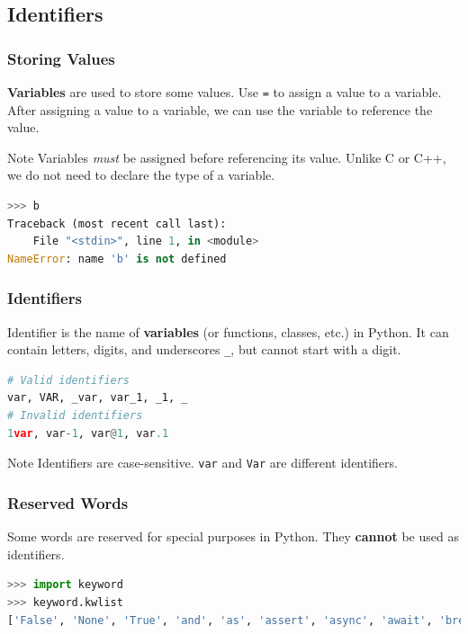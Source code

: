\documentclass[beamer, en, version=2.0]{huangfusl-template}
\begin{document}
    \subsection{Identifiers}
    \begin{frame}[fragile]
        \frametitle{Storing Values}

        \textbf{Variables} are used to store some values. Use {\footnotesize\verb|=|} to assign a value to a variable. After assigning a value to a variable, we can use the variable to reference the value.

        \begin{block}{Note}
            Variables \textit{must} be assigned before referencing its value. Unlike C or C++, we do not need to declare the type of a variable.

\begin{lstlisting}[language=python]
>>> b
Traceback (most recent call last):
    File "<stdin>", line 1, in <module>
NameError: name 'b' is not defined
\end{lstlisting}
        \end{block}
    \end{frame}
    \begin{frame}[fragile]
        \frametitle{Identifiers}

        Identifier is the name of \textbf{variables} (or functions, classes, etc.) in Python. It can contain letters, digits, and underscores {\color{darkblue}\footnotesize\verb|_|}, but cannot start with a digit.

        \begin{lstlisting}[language=python]
# Valid identifiers
var, VAR, _var, var_1, _1, _
# Invalid identifiers
1var, var-1, var@1, var.1
        \end{lstlisting}

        \begin{block}{Note}
            Identifiers are case-sensitive. {\footnotesize\verb|var|} and {\footnotesize\verb|Var|} are different identifiers.
        \end{block}
    \end{frame}
    \begin{frame}[fragile]
        \frametitle{Reserved Words}

        Some words are reserved for special purposes in Python. They \textbf{cannot} be used as identifiers.

        \begin{lstlisting}[language=python, breaklines, breakautoindent=false, breakindent=0pt]
>>> import keyword
>>> keyword.kwlist
['False', 'None', 'True', 'and', 'as', 'assert', 'async', 'await', 'break', 'class', 'continue', 'def', 'del', 'elif', 'else', 'except', 'finally', 'for', 'from', 'global', 'if', 'import', 'in', 'is', 'lambda', 'nonlocal', 'not', 'or', 'pass', 'raise', 'return', 'try', 'while', 'with', 'yield']
        \end{lstlisting}
    \end{frame}
\end{document}
